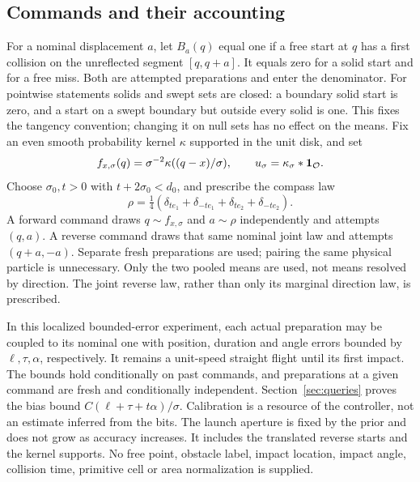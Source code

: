 \subsection{Commands and their accounting}
For a nominal displacement $a$, let $B_a(q)$ equal one if a free start
at $q$ has a first collision on the unreflected segment $[q,q+a]$.
It equals zero for a solid start and for a free miss. Both are attempted
preparations and enter the denominator. For pointwise statements solids and swept sets are closed: a boundary
solid start is zero, and a start on a swept boundary but outside every
solid is one. This fixes the tangency convention; changing it on null
sets has no effect on the means. Fix an even smooth probability kernel
$\kappa$ supported in the unit disk, and set
\[
 f_{x,\sigma}(q)=\sigma^{-2}\kappa((q-x)/\sigma),\qquad
 u_\sigma=\kappa_\sigma*\mathbf 1_{\mathcal O}.
\]
Choose $\sigma_0,t>0$ with $t+2\sigma_0<d_0$, and prescribe the compass
law
\begin{equation}\label{eq:compass}
 \rho=\tfrac14(\delta_{te_1}+\delta_{-te_1}
                         +\delta_{te_2}+\delta_{-te_2}).
\end{equation}
A forward command draws $q\sim f_{x,\sigma}$ and $a\sim\rho$
independently and attempts $(q,a)$. A reverse command draws that same
nominal joint law and attempts $(q+a,-a)$. Separate fresh preparations
are used; pairing the same physical particle is unnecessary. Only the
two pooled means are used, not means resolved by direction. The joint
reverse law, rather than only its marginal direction law, is prescribed.

In this localized bounded-error experiment, each actual preparation may be coupled to its nominal one with position,
duration and angle errors bounded by $\ell,\tau,\alpha$, respectively.
It remains a unit-speed straight flight until its first impact. The
bounds hold conditionally on past commands, and preparations at a given
command are fresh and conditionally independent. Section~\ref{sec:queries}
proves the bias bound $C(\ell+\tau+t\alpha)/\sigma$. Calibration is a
resource of the controller, not an estimate inferred from the bits.
The launch aperture is fixed by the prior and does not grow as accuracy
increases. It includes the translated reverse starts and the kernel
supports. No free point, obstacle label, impact location, impact angle,
collision time, primitive cell or area normalization is supplied.

